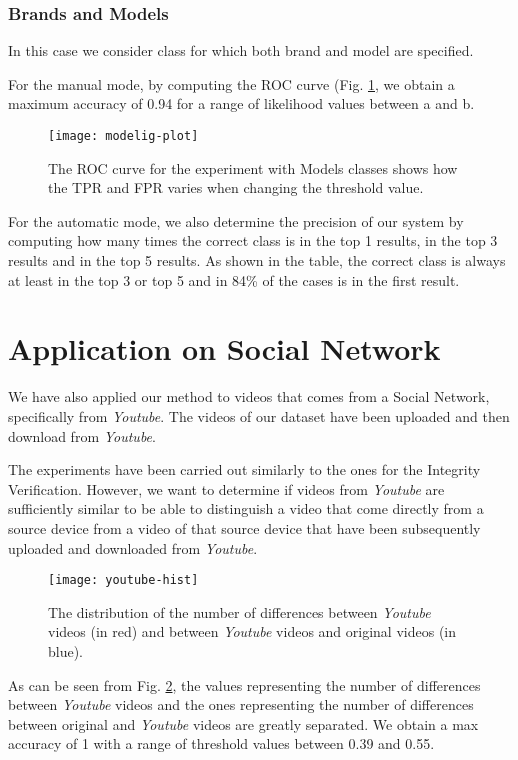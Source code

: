 \subsubsection*{Brands and Models}

In this case we consider class for which both brand and model are specified. 

For the manual mode, by computing the ROC curve (Fig. \ref{fig:model-roc}, we obtain a maximum accuracy of 0.94 for a range of likelihood values between a and b.

\begin{figure}
  \centering
  \texttt{[image: modelig-plot]}
  \caption{The ROC curve for the experiment with Models classes shows how the TPR and FPR varies when changing the threshold value.}\label{fig:model-roc}
\end{figure}

For the automatic mode, we also determine the precision of our system by computing how many times the correct class is in the top 1 results, in the top 3 results and in the top 5 results. As shown in the table, the correct class is always at least in the top 3 or top 5 and in 84\% of the cases is in the first result.

\section{Application on Social Network}

We have also applied our method to videos that comes from a Social Network, specifically from \emph{Youtube}. The videos of our dataset have been uploaded and then download from \emph{Youtube}.

The experiments have been carried out similarly to the ones for the Integrity Verification. However, we want to determine if videos from \emph{Youtube} are sufficiently similar to be able to distinguish a video that come directly from a source device from a video of that source device that have been subsequently uploaded and downloaded from \emph{Youtube}.

\begin{figure}
  \centering
  \texttt{[image: youtube-hist]}
  \caption{The distribution of the number of differences between \emph{Youtube} videos (in red) and between \emph{Youtube} videos and original videos (in blue).}\label{fig:youtube-hist}
\end{figure}

As can be seen from Fig. \ref{fig:youtube-hist}, the values representing the number of differences between \emph{Youtube} videos and the ones representing the number of differences between original and \emph{Youtube} videos are greatly separated. We obtain a max accuracy of 1 with a range of threshold values between 0.39 and 0.55.



